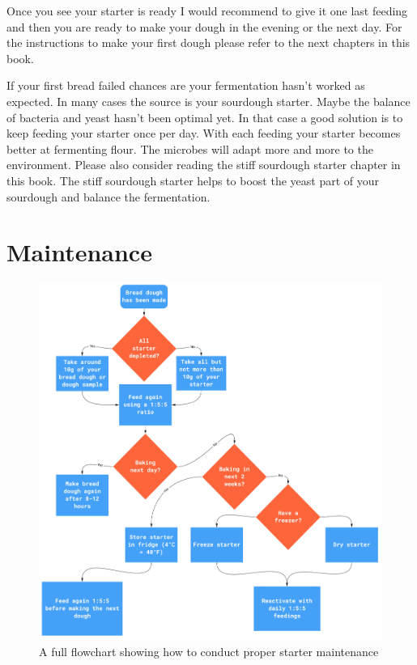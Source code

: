 Once you see your starter is ready I would recommend to give it
one last feeding and then you are ready to make your dough in the
evening or the next day. For the instructions to make your
first dough please refer to the next chapters in this book.

If your first bread failed chances are your fermentation hasn't
worked as expected. In many cases the source is your sourdough starter. Maybe
the balance of bacteria and yeast hasn't been optimal yet. In that case a good
solution is to keep feeding your starter once per day. With each feeding your
starter becomes better at fermenting flour. The microbes will adapt more and
more to the environment. Please also consider reading the stiff sourdough starter
chapter in this book. The stiff sourdough starter helps to boost the
yeast part of your sourdough and balance the fermentation.

\section{Maintenance}

\begin{figure}[!htb]
  \includegraphics[width=\textwidth]{sourdough-starter-maintenance-process.jpg}
  \caption{A full flowchart showing how to conduct proper starter maintenance}
  \label{fig:sourdough-maintenance-process}
\end{figure}

